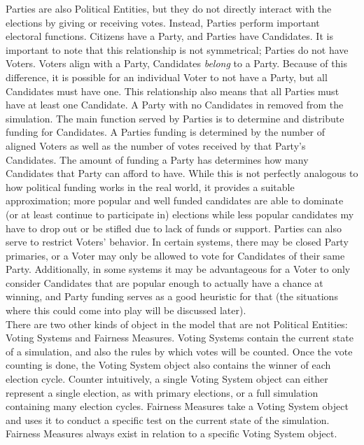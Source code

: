 \documentclass[12pt]{article}
\begin{document}
\qquad Parties are also Political Entities, but they do not directly interact with the elections by giving or receiving votes. Instead, Parties perform important electoral functions. Citizens have a Party, and Parties have Candidates. It is important to note that this relationship is not symmetrical; Parties do not have Voters. Voters align with a Party, Candidates \textit{belong} to a Party. Because of this difference, it is possible for an individual Voter to not have a Party, but all Candidates must have one. This relationship also means that all Parties must have at least one Candidate. A Party with no Candidates in removed from the simulation. The main function served by Parties is to determine and distribute funding for Candidates. A Parties funding is determined by the number of aligned Voters as well as the number of votes received by that Party's Candidates. The amount of funding a Party has determines how many Candidates that Party can afford to have. While this is not perfectly analogous to how political funding works in the real world, it provides a suitable approximation; more popular and well funded candidates are able to dominate (or at least continue to participate in) elections while less popular candidates my have to drop out or be stifled due to lack of funds or support. Parties can also serve to restrict Voters' behavior. In certain systems, there may be closed Party primaries, or a Voter may only be allowed to vote for Candidates of their same Party. Additionally, in some systems it may be advantageous for a Voter to only consider Candidates that are popular enough to actually have a chance at winning, and Party funding serves as a good heuristic for that (the situations where this could come into play will be discussed later). \\

\qquad There are two other kinds of object in the model that are not Political Entities: Voting Systems and Fairness Measures. Voting Systems contain the current state of a simulation, and also the rules by which votes will be counted. Once the vote counting is done, the Voting System object also contains the winner of each election cycle. Counter intuitively, a single Voting System object can either represent a single election, as with primary elections, or a full simulation containing many election cycles. Fairness Measures take a Voting System object and uses it to conduct a specific test on the current state of the simulation. Fairness Measures always exist in relation to a specific Voting System object. \\
\end{document}
